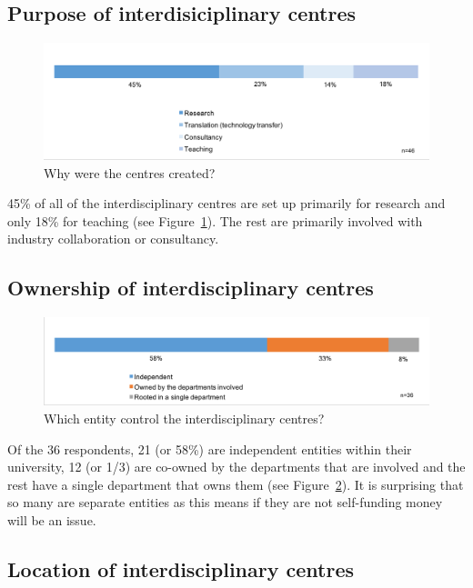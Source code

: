 \subsection{Purpose of interdisiciplinary centres}

\begin{figure}[h]
\centering
\includegraphics[width = \linewidth]{charts/5b.png}
\caption{Why were the centres created?}
\label{sect5:reasons}
\end{figure}

45\% of all of the interdisciplinary centres are set up primarily for research and only 18\% for teaching (see Figure~\ref{sect5:reasons}). The rest are primarily involved with industry collaboration or consultancy.

\subsection{ Ownership of interdisciplinary centres}

\begin{figure}[h]
\centering
\includegraphics[width = \linewidth]{charts/5c.png}
\caption{Which entity control the interdisciplinary centres?}
\label{sect5:owners}
\end{figure}

Of the 36 respondents, 21 (or 58\%) are independent entities within their university, 12 (or 1/3) are co-owned by the departments that are involved and the rest have a single department that owns them (see Figure~\ref{sect5:owners}). It is surprising that so many are separate entities as this means if they are not self-funding money will be an issue.

\subsection{ Location of interdisciplinary centres}


